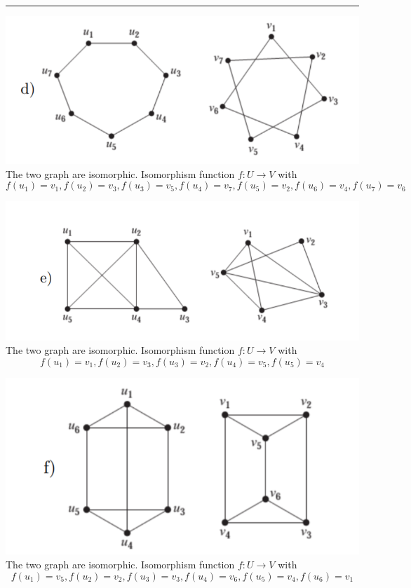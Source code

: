 \documentclass{article}
\begin{document}
\smallskip

\hrule

\bigskip

\bigskip 
\includegraphics[scale = 0.8]{problem_4/graph_4.d.png}
\newline
The two graph are isomorphic. Isomorphism function $ f : U \rightarrow V $ with
$$ f(u_1) = v_1, f(u_2) = v_3, f(u_3) = v_5, f(u_4) = v_7, f(u_5) = v_2, f(u_6) = v_4, f(u_7) = v_6 $$

\includegraphics[scale = 0.8]{problem_4/graph_4.e.png}
\newline
The two graph are isomorphic. Isomorphism function $ f : U \rightarrow V $ with
$$ f(u_1) = v_1, f(u_2) = v_3, f(u_3) = v_2, f(u_4) = v_5, f(u_5) = v_4 $$

\includegraphics[scale = 0.8]{problem_4/graph_4.f.png}
\newline
The two graph are isomorphic. Isomorphism function $ f : U \rightarrow V $ with
$$ f(u_1) = v_5, f(u_2) = v_2, f(u_3) = v_3, f(u_4) = v_6, f(u_5) = v_4, f(u_6) = v_1 $$
\newpage
\end{document}

